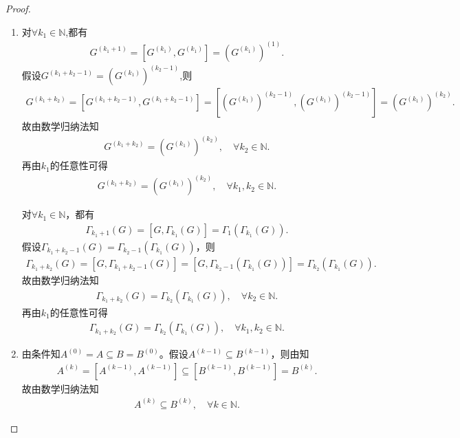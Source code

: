 \documentclass[../../main.tex]{subfiles}%
\begin{document}
\begin{proof}
\begin{enumerate}[(1)]
\item 对$\forall k_1\in \mathbb{N}$,都有
\begin{align*}
G^{(k_1+1)} = [G^{(k_1)}, G^{(k_1)}] = (G^{(k_1)})^{(1)}.
\end{align*}
假设$G^{(k_1+k_2-1)} = (G^{(k_1)})^{(k_2-1)}$,则
\begin{align*}
G^{(k_1+k_2)} = [G^{(k_1+k_2-1)}, G^{(k_1+k_2-1)}] = [(G^{(k_1)})^{(k_2-1)}, (G^{(k_1)})^{(k_2-1)}] = (G^{(k_1)})^{(k_2)}.
\end{align*}
故由数学归纳法知
\begin{align*}
G^{(k_1+k_2)} = (G^{(k_1)})^{(k_2)},\quad \forall k_2 \in \mathbb{N}.
\end{align*}
再由$k_1$的任意性可得
\begin{align*}
G^{(k_1+k_2)} = (G^{(k_1)})^{(k_2)},\quad \forall k_1,k_2 \in \mathbb{N}.
\end{align*}

对$\forall k_1\in \mathbb{N}$，都有
\begin{align*}
\Gamma _{k_1+1}\left( G \right) =\left[ G,\Gamma _{k_1}\left( G \right) \right] =\Gamma _1\left( \Gamma _{k_1}\left( G \right) \right).
\end{align*}
假设$\Gamma _{k_1+k_2-1}\left( G \right) =\Gamma _{k_2-1}\left( \Gamma _{k_1}\left( G \right) \right)$，则
\begin{align*}
\Gamma _{k_1+k_2}\left( G \right) =\left[ G,\Gamma _{k_1+k_2-1}\left( G \right) \right] =\left[ G,\Gamma _{k_2-1}\left( \Gamma _{k_1}\left( G \right) \right) \right] =\Gamma _{k_2}\left( \Gamma _{k_1}\left( G \right) \right).
\end{align*}
故由数学归纳法知
\begin{align*}
\Gamma _{k_1+k_2}\left( G \right) =\Gamma _{k_2}\left( \Gamma _{k_1}\left( G \right) \right),\quad \forall k_2\in \mathbb{N}.
\end{align*}
再由$k_1$的任意性可得
\begin{align*}
\Gamma _{k_1+k_2}\left( G \right) =\Gamma _{k_2}\left( \Gamma _{k_1}\left( G \right) \right),\quad \forall k_1,k_2\in \mathbb{N}.
\end{align*}

\item 由条件知$A^{\left( 0 \right)}=A\subseteq B=B^{\left( 0 \right)}$。假设$A^{\left( k-1 \right)}\subseteq B^{\left( k-1 \right)}$，则由知
\begin{align*}
A^{\left( k \right)}=\left[ A^{\left( k-1 \right)},A^{\left( k-1 \right)} \right] \subseteq \left[ B^{\left( k-1 \right)},B^{\left( k-1 \right)} \right] =B^{\left( k \right)}.
\end{align*}
故由数学归纳法知
\begin{align*}
A^{\left( k \right)}\subseteq B^{\left( k \right)},\quad \forall k\in \mathbb{N}.
\end{align*}


\end{enumerate}
\end{proof}
\end{document}

